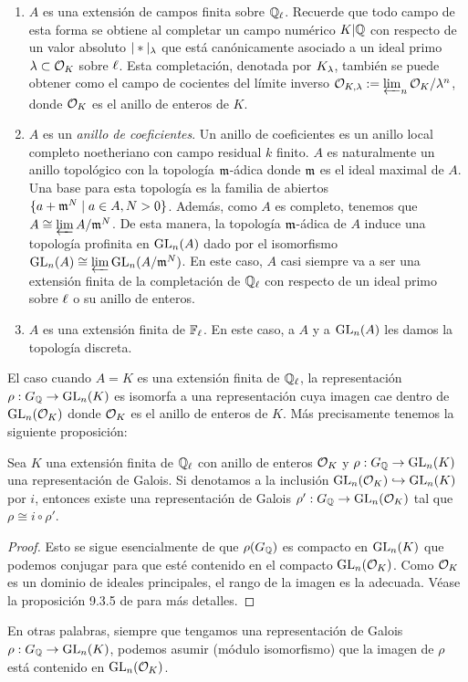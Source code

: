 \begin{enumerate}
\item $A$ es una extensi\'on de campos finita sobre $\mathbb{Q}_{\ell}$. Recuerde que todo campo de esta forma se obtiene al completar un campo num\'erico $K|\mathbb{Q}$ con respecto de un valor absoluto $|\ast|_{\lambda}$ que est\'a can\'onicamente asociado a un ideal primo $\lambda\subset\mathcal{O}_K$ sobre $\ell$. Esta completaci\'on, denotada por $K_{\lambda}$, tambi\'en se puede obtener como el campo de cocientes del l\'imite inverso $\mathcal{O}_{K,\lambda}:=\varprojlim_n \mathcal{O}_K/\lambda^n$, donde $\mathcal{O}_K$ es el anillo de enteros de $K$.
\item $A$ es un \emph{anillo de coeficientes}. Un anillo de coeficientes es un anillo local completo noetheriano con campo residual $k$ finito. $A$ es naturalmente un anillo topol\'ogico con la topolog\'ia $\mathfrak{m}$-\'adica donde $\mathfrak{m}$ es el ideal maximal de $A$. Una base para esta topolog\'ia es la familia de abiertos $\{a+\mathfrak{m}^N\mid a\in A, N>0\}$. Adem\'as, como $A$ es completo, tenemos que $A\cong\varprojlim A/\mathfrak{m}^N$. De esta manera, la topolog\'ia $\mathfrak{m}$-\'adica de $A$ induce una topolog\'ia profinita en $\mathrm{GL}_n(A)$ dado por el isomorfismo $\mathrm{GL}_n(A)\cong\varprojlim\mathrm{GL}_n(A/\mathfrak{m}^N)$. En este caso, $A$ casi siempre va a ser una extensi\'on finita de la completaci\'on de $\mathbb{Q}_{\ell}$ con respecto de un ideal primo sobre $\ell$ o su anillo de enteros.
\item $A$ es una extensi\'on finita de $\mathbb{F}_{\ell}$. En este caso, a $A$ y a $\mathrm{GL}_n(A)$ les damos la topolog\'ia discreta.
\end{enumerate}



El caso cuando $A=K$ es una extensi\'on finita de $\mathbb{Q}_{\ell}$, la representaci\'on $\rho:G_{\mathbb{Q}}\rightarrow\mathrm{GL}_n(K)$ es isomorfa a una representaci\'on cuya imagen cae dentro de $\mathrm{GL}_n(\mathcal{O}_K)$ donde $\mathcal{O}_K$ es el anillo de enteros de $K$. M\'as precisamente tenemos la siguiente proposici\'on:

\begin{prop}\label{prop:imagen_entera_rho}
  Sea $K$ una extensi\'on finita de $\mathbb{Q}_\ell$ con anillo de enteros $\mathcal{O}_K$ y $\rho:G_{\mathbb{Q}}\rightarrow\mathrm{GL}_n(K)$ una representaci\'on de Galois. Si denotamos a la inclusi\'on $\mathrm{GL}_n(\mathcal{O}_K)\hookrightarrow\mathrm{GL}_n(K)$ por $i$, entonces existe una representaci\'on de Galois $\rho':G_{\mathbb{Q}}\rightarrow\mathrm{GL}_n(\mathcal{O}_K)$ tal que $\rho\cong i\circ\rho'$. 
\end{prop}
\begin{proof}
  Esto se sigue esencialmente de que $\rho(G_{\mathbb{Q}})$ es compacto en $\mathrm{GL}_n(K)$ que podemos conjugar para que est\'e contenido en el compacto $\mathrm{GL}_n(\mathcal{O}_K)$. Como $\mathcal{O}_K$ es un dominio de ideales principales, el rango de la imagen es la adecuada. V\'ease la proposici\'on 9.3.5 de \cite{DiamondShurmanAFCIMF} para m\'as detalles.
\end{proof}
En otras palabras, siempre que tengamos una representaci\'on de Galois $\rho:G_{\mathbb{Q}}\rightarrow\mathrm{GL}_n(K)$, podemos asumir (m\'odulo isomorfismo) que la imagen de $\rho$ est\'a contenido en $\mathrm{GL}_n(\mathcal{O}_K)$.

